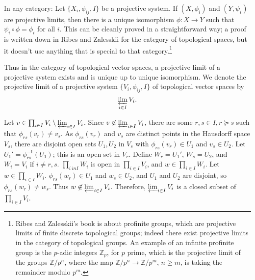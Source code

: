 \documentclass{article}
\begin{document}
 In any category: Let $\{X_i,\phi_{ij},I\}$ be a projective system. If $(X,\phi_i)$ and $(Y,\psi_i)$ are projective limits, then there
 is a unique isomorphism $\phi:X \to Y$ such that $\psi_i \circ \phi = \phi_i$ for all $i$. This can be cleanly proved in a straightforward way; a proof
 is written down in Ribes and Zalesskii for the category of topological spaces, but it doesn't use anything that is special to that category.\footnote{Ribes and Zalesskii's book is about profinite groups, which are projective limits of finite discrete
topological groups; indeed there exist projective limits in the category of topological groups. An example of an infinite profinite group is
the $p$-adic integers $\mathbb{Z}_p$, for $p$ prime, which is the projective limit of the groups $\mathbb{Z}/p^n$, where the map
$\mathbb{Z}/p^n \to \mathbb{Z}/p^m$, $n \geq m$, is taking the remainder modulo $p^m$.}

Thus in the category of topological vector spaces, a projective limit of a projective system exists and is unique up to unique isomorphism.
We denote the projective limit of a projective system $\{V_i,\phi_{ij},I\}$ of topological vector spaces by
\[
\varprojlim_{i \in I} V_i.
\]

Let $v \in \prod_{i \in I} V_i \setminus \varprojlim_{i \in I} V_i$. Since $v \not \in  \varprojlim_{i \in I} V_i$, there are
some $r,s \in I, r \succeq s$ such that $\phi_{rs}(v_r) \neq v_s$. As $\phi_{rs}(v_r)$ and $v_s$ are distinct
points in the Hausdorff space $V_s$, there are disjoint open sets $U_1,U_2$ in $V_s$ with $\phi_{rs}(v_r) \in U_1$
and $v_s \in U_2$. Let $U_1'=\phi_{rs}^{-1}(U_1)$; this is an open set in $V_r$. Define $W_r=U_1'$, $W_s=U_2$, and
$W_i = V_i$ if $i \neq r,s$. $\prod_{i \ in I} W_i$ is open in $\prod_{i \in I} V_i$, and $w \in \prod_{i \in I} W_i$. Let
$w \in \prod_{i \in I} W_i$. $\phi_{rs}(w_r) \in U_1$ and $w_s \in U_2$, and $U_1$ and $U_2$ are disjoint, so
$\phi_{rs}(w_r) \neq w_s$. Thus $w \not \in \varprojlim_{i \in I} V_i$. Therefore, $\varprojlim_{i \in I} V_i$ is a closed
subset of $\prod_{i \in I} V_i$. 
\end{document}
